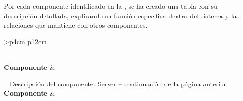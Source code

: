 Por cada componente identificado en la ,
se ha creado una tabla con su descripción detallada, explicando su función específica dentro del sistema y las relaciones que mantiene con otros componentes.

\begin{longtable}{
    >{}p{4cm}
    p{12cm}
    }
    \caption{Descripción del componente:  Server} \label{table:descripcion_server} \\
    \toprule
    \textbf{Componente} &  \\
    \endfirsthead
    
    {{ \tablename\ \thetable{} Descripción del componente:  Server -- continuación de la página anterior}} \\
    \toprule
    \textbf{Componente} &  \\
    \midrule
    \endhead
    
    \midrule
     \\ 
    \endfoot
    
    \bottomrule
    \endlastfoot
    

\end{longtable}
